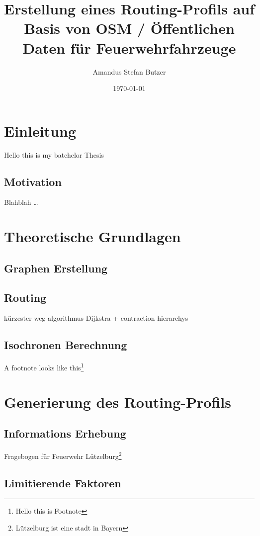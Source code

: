 \documentclass[10pt,a4paper]{article}
\author{Amandus Stefan Butzer}
\title{Erstellung eines Routing-Profils auf Basis von OSM / Öffentlichen Daten für Feuerwehrfahrzeuge}
\date{\today}
\begin{document}
\maketitle


\section{Einleitung}

Hello this is my batchelor Thesis

\subsection{Motivation}

Blahblah \ldots

\section{Theoretische Grundlagen}

\subsection{Graphen Erstellung}

\subsection{Routing}

kürzester weg 
algorithmus Dijkstra + contraction hierarchys

\subsection{Isochronen Berechnung}
A footnote looks like this\footnote{Hello this is Footnote}

\section{Generierung des Routing-Profils}

\subsection{Informations Erhebung}
Fragebogen für Feuerwehr Lützelburg\footnote{Lützelburg ist eine stadt in Bayern}

\subsection{Limitierende Faktoren}
\end{document}
